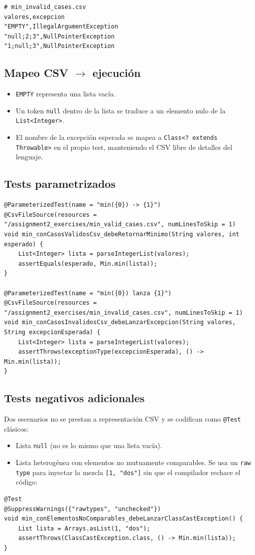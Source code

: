 \documentclass[12pt,a4paper]{article}
\begin{document}
\begin{lstlisting}[style=plain]
# min_invalid_cases.csv
valores,excepcion
"EMPTY",IllegalArgumentException
"null;2;3",NullPointerException
"1;null;3",NullPointerException
\end{lstlisting}

\subsection{Mapeo CSV $\rightarrow$ ejecución}
\begin{itemize}
  \item \texttt{EMPTY} representa una lista vacía.
  \item Un token \texttt{null} dentro de la lista se traduce a un elemento nulo de la \texttt{List<Integer>}.
  \item El nombre de la excepción esperada se mapea a \texttt{Class<? extends Throwable>} en el propio test, manteniendo el CSV libre de detalles del lenguaje.
\end{itemize}

\subsection{Tests parametrizados}
\begin{lstlisting}[style=javastyle]
@ParameterizedTest(name = "min({0}) -> {1}")
@CsvFileSource(resources = "/assignment2_exercises/min_valid_cases.csv", numLinesToSkip = 1)
void min_conCasosValidosCsv_debeRetornarMinimo(String valores, int esperado) {
    List<Integer> lista = parseIntegerList(valores);
    assertEquals(esperado, Min.min(lista));
}

@ParameterizedTest(name = "min({0}) lanza {1}")
@CsvFileSource(resources = "/assignment2_exercises/min_invalid_cases.csv", numLinesToSkip = 1)
void min_conCasosInvalidosCsv_debeLanzarExcepcion(String valores, String excepcionEsperada) {
    List<Integer> lista = parseIntegerList(valores);
    assertThrows(exceptionType(excepcionEsperada), () -> Min.min(lista));
}
\end{lstlisting}

\subsection{Tests negativos adicionales}
Dos escenarios no se prestan a representación CSV y se codifican como \texttt{@Test} clásicos:
\begin{itemize}
  \item Lista \texttt{null} (no es lo mismo que una lista vacía).
  \item Lista heterogénea con elementos no mutuamente comparables. Se usa un \texttt{raw type} para inyectar la mezcla \texttt{[1, "dos"]} sin que el compilador rechace el código:
\end{itemize}
\begin{lstlisting}[style=javastyle]
@Test
@SuppressWarnings({"rawtypes", "unchecked"})
void min_conElementosNoComparables_debeLanzarClassCastException() {
    List lista = Arrays.asList(1, "dos");
    assertThrows(ClassCastException.class, () -> Min.min(lista));
}
\end{lstlisting}
\end{document}
